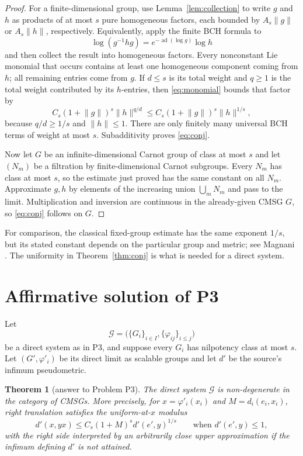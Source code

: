 \documentclass[10pt]{article}
\newtheorem{theorem}{Theorem}
\newcommand{\norm}[1]{\lVert #1\rVert}
\begin{document}
\begin{proof}
For a finite-dimensional group, use Lemma~\ref{lem:collection} to write $g$
and $h$ as products of at most $s$ pure homogeneous factors, each bounded by
$A_s\norm g$ or $A_s\norm h$, respectively.  Equivalently, apply the finite
BCH formula to
\[
       \log(g^{-1}hg)=e^{-\operatorname{ad}(\log g)}\log h
\]
and then collect the result into homogeneous factors.  Every nonconstant Lie
monomial that occurs contains at least one homogeneous component coming from
$h$; all remaining entries come from $g$.  If $d\leq s$ is its total weight
and $q\geq1$ is the total weight contributed by its $h$-entries, then
\eqref{eq:monomial} bounds that factor by
\[
        C_s(1+\norm g)^s\norm h^{q/d}
        \leq C_s(1+\norm g)^s\norm h^{1/s},
\]
because $q/d\geq1/s$ and $\norm h\leq1$.  There are only finitely many
universal BCH terms of weight at most $s$.  Subadditivity proves
\eqref{eq:conj}.

Now let $G$ be an infinite-dimensional Carnot group of class at most $s$ and
let $(N_m)$ be a filtration by finite-dimensional Carnot subgroups.  Every
$N_m$ has class at most $s$, so the estimate just proved has the same constant
on all $N_m$.  Approximate $g,h$ by elements of the increasing union
$\bigcup_mN_m$ and pass to the limit.  Multiplication and inversion are
continuous in the already-given CMSG $G$, so \eqref{eq:conj} follows on $G$.
\end{proof}

For comparison, the classical fixed-group estimate has the same exponent
$1/s$, but its stated constant depends on the particular group and metric;
see Magnani \cite[Lemma~3.6]{Mag}.  The uniformity in
Theorem~\ref{thm:conj} is what is needed for a direct system.

\section*{Affirmative solution of P3}

Let
\[
 \mathcal G=\big(\{G_i\}_{i\in I},\{\varphi_{ij}\}_{i\leq j}\big)
\]
be a direct system as in P3, and suppose every $G_i$ has nilpotency class at
most $s$.  Let $(G',\varphi'_i)$ be its direct limit as scalable groups and
let $d'$ be the source's infimum pseudometric.

\begin{theorem}[answer to Problem P3]\label{thm:p3}
The direct system $\mathcal G$ is non-degenerate in the category of CMSGs.
More precisely, for $x=\varphi'_i(x_i)$ and
$M=d_i(e_i,x_i)$, right translation satisfies the uniform-at-$x$ modulus
\begin{equation}\label{eq:rightmod}
 d'(x,yx)\leq C_s(1+M)^s d'(e',y)^{1/s}
 \qquad\text{when }d'(e',y)\leq1,
\end{equation}
with the right side interpreted by an arbitrarily close upper approximation
if the infimum defining $d'$ is not attained.
\end{theorem}
\end{document}
